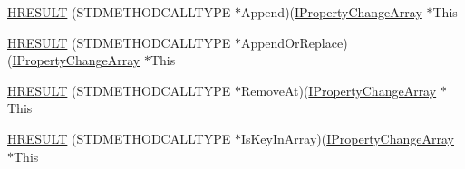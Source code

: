 \begin{DoxyCompactItemize}
\item 
\hyperlink{struct_i_property_change_array_vtbl_a8e45788322fa719f2bc16783c610189d}{H\+R\+E\+S\+U\+LT} (S\+T\+D\+M\+E\+T\+H\+O\+D\+C\+A\+L\+L\+T\+Y\+PE $\ast$Append)(\hyperlink{propsys_8h_a487ed316865c4f74127303008bf5e18b}{I\+Property\+Change\+Array} $\ast$This
\item 
\hyperlink{struct_i_property_change_array_vtbl_a9f7169f6ee208f580926ac0963f56378}{H\+R\+E\+S\+U\+LT} (S\+T\+D\+M\+E\+T\+H\+O\+D\+C\+A\+L\+L\+T\+Y\+PE $\ast$Append\+Or\+Replace)(\hyperlink{propsys_8h_a487ed316865c4f74127303008bf5e18b}{I\+Property\+Change\+Array} $\ast$This
\item 
\hyperlink{struct_i_property_change_array_vtbl_a7fd17dd9e64b5c664612be963dc88a13}{H\+R\+E\+S\+U\+LT} (S\+T\+D\+M\+E\+T\+H\+O\+D\+C\+A\+L\+L\+T\+Y\+PE $\ast$Remove\+At)(\hyperlink{propsys_8h_a487ed316865c4f74127303008bf5e18b}{I\+Property\+Change\+Array} $\ast$This
\item 
\hyperlink{struct_i_property_change_array_vtbl_a40df1ce008746ed98002622939ccbf82}{H\+R\+E\+S\+U\+LT} (S\+T\+D\+M\+E\+T\+H\+O\+D\+C\+A\+L\+L\+T\+Y\+PE $\ast$Is\+Key\+In\+Array)(\hyperlink{propsys_8h_a487ed316865c4f74127303008bf5e18b}{I\+Property\+Change\+Array} $\ast$This
\end{DoxyCompactItemize}

